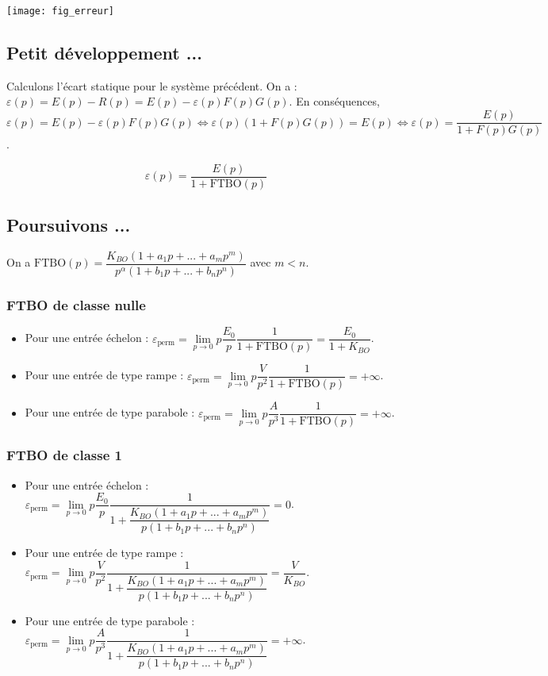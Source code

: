 \begin{center}
\texttt{[image: fig\_erreur]}
\end{center}

\subsection*{Petit développement ...}

Calculons l'écart statique pour le système précédent. On a : $\varepsilon(p)=E(p)-R(p)=E(p)-\varepsilon(p) F(p) G(p)$. En conséquences,
$\varepsilon(p)=E(p)-\varepsilon(p) F(p) G(p) 
\Longleftrightarrow \varepsilon(p)\left( 1+F(p) G(p) \right) =E(p) 
\Longleftrightarrow   \varepsilon(p) =\dfrac{E(p)}{1+F(p) G(p)}$.

\begin{resultat}
$$\varepsilon(p) =\dfrac{E(p)}{1+\text{FTBO}(p)}$$
\end{resultat}


\subsection*{Poursuivons ...}
On a $\text{FTBO}(p)=\dfrac{K_{BO}\left(1+a_1p+...+a_mp^m \right)}{p^{\alpha}\left(1+b_1p+...+b_np^n\right)}$ avec $m< n$.
\subsubsection*{FTBO de classe nulle}

\begin{itemize}
\item Pour une entrée échelon : 
$\varepsilon_{\text{perm}}=\lim\limits_{p\to 0} p\dfrac{E_0}{p}\dfrac{1}{1+\text{FTBO}(p)} 
= \dfrac{E_0}{1+K_{BO}}$.
\item Pour une entrée de type rampe : 
$\varepsilon_{\text{perm}}=\lim\limits_{p\to 0} p\dfrac{V}{p^2}\dfrac{1}{1+\text{FTBO}(p)} 
=+\infty$.
\item Pour une entrée de type parabole : 
$\varepsilon_{\text{perm}}=\lim\limits_{p\to 0} p\dfrac{A}{p^3}\dfrac{1}{1+\text{FTBO}(p)} 
=+\infty$.
\end{itemize}

\subsubsection*{FTBO de classe 1}

\begin{itemize}
\item Pour une entrée échelon : 
$\varepsilon_{\text{perm}}=\lim\limits_{p\to 0} p\dfrac{E_0}{p}\dfrac{1}{1+\dfrac{K_{BO}\left(1+a_1p+...+a_mp^m \right)}{p\left(1+b_1p+...+b_np^n\right)}} 
= 0$.
\item Pour une entrée de type rampe : 
$\varepsilon_{\text{perm}}=\lim\limits_{p\to 0} p\dfrac{V}{p^2}\dfrac{1}{1+\dfrac{K_{BO}\left(1+a_1p+...+a_mp^m \right)}{p\left(1+b_1p+...+b_np^n\right)}} 
=\dfrac{V}{K_{BO}}$.
\item Pour une entrée de type parabole : 
$\varepsilon_{\text{perm}}=\lim\limits_{p\to 0} p\dfrac{A}{p^3}\dfrac{1}{1+\dfrac{K_{BO}\left(1+a_1p+...+a_mp^m \right)}{p\left(1+b_1p+...+b_np^n\right)}} 
=+\infty$.
\end{itemize}

